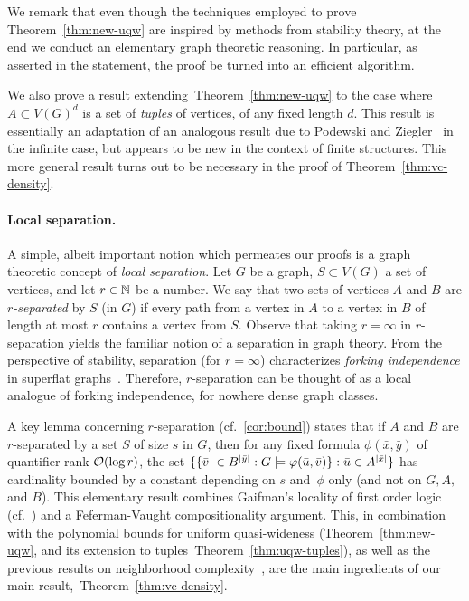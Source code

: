 We remark
that even though the techniques employed to prove Theorem~\ref{thm:new-uqw} are inspired by methods from stability theory, 
at the end we conduct an elementary graph theoretic reasoning. In particular, as asserted in the statement, the
proof be turned into an efficient algorithm.

We also prove a result extending~Theorem~\ref{thm:new-uqw}
to the case where $A\subset V(G)^d$ is a set of \emph{tuples} of vertices, of any fixed length $d$.
This result is essentially an adaptation of an analogous result due to Podewski and Ziegler~\cite{podewski1978stable} in the infinite case,
but appears to be new in the context of finite structures.
This more general result turns out to be necessary in the proof of Theorem~\ref{thm:vc-density}.

\paragraph{Local separation.}
A simple, albeit important notion which permeates our proofs
is a graph theoretic concept of \emph{local separation}.
Let $G$ be a graph, $S\subset V(G)$ a set of vertices,
and let $r\in \mathbb{N}$ be a number. We say that two  sets of vertices $A$ and $B$  are \emph{$r$-separated} by $S$ (in $G$) if every path from a vertex in $A$ to a vertex in $B$
of length at most $r$ contains a vertex from $S$. %
 Observe that taking $r=\infty$ in $r$-separation yields the familiar notion of a separation in graph theory.
From the perspective of stability, separation (for $r=\infty$) characterizes \emph{forking independence} in superflat graphs~\cite{ivanov}. Therefore,
$r$-separation can be thought of as a local analogue of forking independence, for nowhere dense graph classes.

A key lemma concerning $r$-separation (cf.~\autoref{cor:bound}) states that if $A$
and $B$ are $r$-separated by a set $S$ of size $s$ in $G$,
then for any fixed formula $\phi(\bar x,\bar y)$
of quantifier rank $\mathcal{O}(\log r)$,
the set  $\{\{\bar{v}\ \in B^{|\bar y|} : G\models\varphi(\bar{u},\bar{v})\} : \bar{u}\in A^{|\bar x|}\}$ has cardinality bounded by a constant depending on $s$ and~$\phi$ only (and not on $G,A,$ and $B$). 
This elementary result combines Gaifman's locality of first order logic (cf.~\cite{gaifman1982local}) and a Feferman-Vaught compositionality argument. This, in combination with the polynomial bounds 
for uniform quasi-wideness (Theorem~\ref{thm:new-uqw}, and its extension to tuples~Theorem~\ref{thm:uqw-tuples}), 
as well as the previous results on neighborhood complexity~\cite{drange2016kernelization,eickmeyer2016neighborhood}, are the main ingredients of our main result,~Theorem~\ref{thm:vc-density}.

